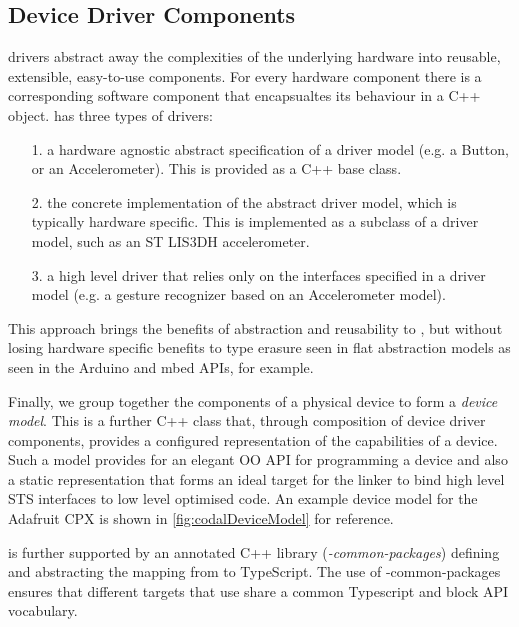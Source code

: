 \subsection{Device Driver Components}
\CO drivers abstract away the complexities of the underlying hardware into reusable, extensible, easy-to-use components. For every hardware component there is a corresponding software component that encapsualtes its behaviour in a C++ object. \CO has three types of drivers:
\begin{itemize}
    \item[1.] a hardware agnostic abstract specification of a driver model (e.g. a Button, or an Accelerometer). This is provided as a C++ base class.
    \item[2.] the concrete implementation of the abstract driver model, which is typically hardware specific. This is implemented as a subclass of a driver model, such as an ST LIS3DH accelerometer.
    \item[3.] a high level driver that relies only on the interfaces specified in a driver model (e.g. a gesture recognizer based on an Accelerometer model).

\end{itemize}

This approach brings the benefits of abstraction and reusability to \CO, but without losing hardware specific benefits to type erasure seen in flat abstraction models as seen in the Arduino and mbed APIs, for example.

Finally, we group together the components of a physical device to form a \emph{device model}. This is a further C++ class that, through composition of device driver components, provides a configured representation of the capabilities of a device. Such a model provides for an elegant OO API for programming a device and also a static representation that forms an ideal target for the \MCN linker to bind high level STS interfaces to low level optimised code. An example device model for the Adafruit CPX is shown in \ref{fig:codalDeviceModel} for reference.

 \MCN is further supported by an annotated C++ library (\emph{\MC-common-packages}) defining and abstracting the mapping from \CO to TypeScript. The use of \MC-common-packages ensures that different \MCN targets that use \CO share a common Typescript and block API vocabulary. 


